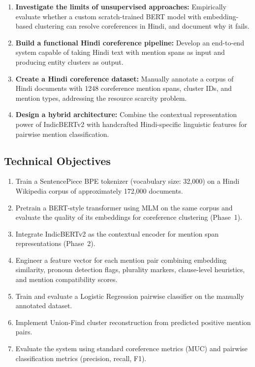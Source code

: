 \documentclass[12pt,a4paper]{report}
\begin{document}
\begin{enumerate}
    \item \textbf{Investigate the limits of unsupervised approaches:} Empirically evaluate whether a custom scratch-trained BERT model with embedding-based clustering can resolve coreferences in Hindi, and document why it fails.
    \item \textbf{Build a functional Hindi coreference pipeline:} Develop an end-to-end system capable of taking Hindi text with mention spans as input and producing entity clusters as output.
    \item \textbf{Create a Hindi coreference dataset:} Manually annotate a corpus of Hindi documents with 1248 coreference mention spans, cluster IDs, and mention types, addressing the resource scarcity problem.
    \item \textbf{Design a hybrid architecture:} Combine the contextual representation power of IndicBERTv2 with handcrafted Hindi-specific linguistic features for pairwise mention classification.
\end{enumerate}

\subsection{Technical Objectives}

\begin{enumerate}
    \item Train a SentencePiece BPE tokenizer (vocabulary size: 32,000) on a Hindi Wikipedia corpus of approximately 172,000 documents.
    \item Pretrain a BERT-style transformer using MLM on the same corpus and evaluate the quality of its embeddings for coreference clustering (Phase~1).
    \item Integrate IndicBERTv2 as the contextual encoder for mention span representations (Phase~2).
    \item Engineer a feature vector for each mention pair combining embedding similarity, pronoun detection flags, plurality markers, clause-level heuristics, and mention compatibility scores.
    \item Train and evaluate a Logistic Regression pairwise classifier on the manually annotated dataset.
    \item Implement Union-Find cluster reconstruction from predicted positive mention pairs.
    \item Evaluate the system using standard coreference metrics (MUC) and pairwise classification metrics (precision, recall, F1).
\end{enumerate}
\end{document}
